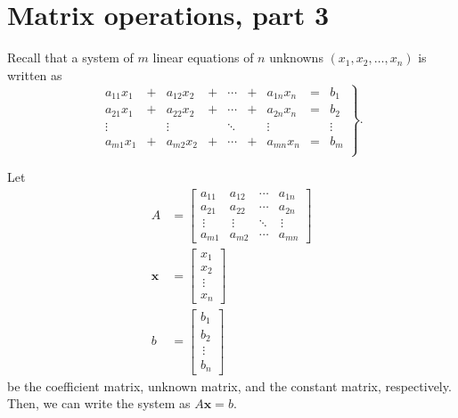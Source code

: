 \section{Matrix operations, part 3}
    \renewcommand{\leftmark}{August 16, 2023}

    Recall that a system of \(m\) linear equations of \(n\) unknowns \((x_1, x_2, \ldots, x_n)\) is written as
    \[\renewcommand{\arraystretch}{1.15}\left.\begin{array}{ccccccccc}
        a_{11}x_1 &+& a_{12}x_2 &+& \cdots &+& a_{1n}x_n &=& b_1 \\
        a_{21}x_1 &+& a_{22}x_2 &+& \cdots &+& a_{2n}x_n &=& b_2 \\
        \vdots &\phantom{+}& \vdots &\phantom{+}& \ddots &\phantom{+}& \vdots &\phantom{=}& \vdots \\
        a_{m1}x_1 &+& a_{m2}x_2 &+& \cdots &+& a_{mn}x_n &=& b_m \\
    \end{array}\right\}.\]

    Let
    \begin{align*}
        A &= \begin{bmatrix}
            a_{11} & a_{12} & \cdots & a_{1n} \\
            a_{21} & a_{22} & \cdots & a_{2n} \\
            \,\vdots & \,\vdots & \ddots & \,\vdots \\
            a_{m1} & a_{m2} & \cdots & a_{mn}
        \end{bmatrix} \\
        \mathbf{x} &= \begin{bmatrix}
            x_1 \\ x_2 \\ \,\vdots \\ x_n
        \end{bmatrix} \\
        b &= \begin{bmatrix}
            b_1 \\ b_2 \\ \,\vdots \\ b_n
        \end{bmatrix}
    \end{align*}
    be the coefficient matrix, unknown matrix, and the constant matrix, respectively. Then, we can write the system as \(A\mathbf{x} = b\).

